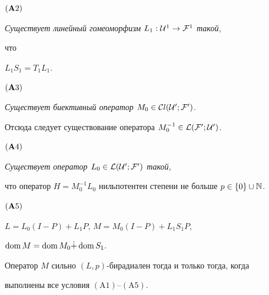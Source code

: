 $({\bold A2})$


{\it Существует линейный гомеоморфизм $L_1:{\cal U}^1\to {\cal F}^1$ такой,


что} $L_1S_1=T_1L_1$.





$({\bold A3})$


{\it Существует биективный оператор} $M_0\in {\cal C}l(\cal U^0;


\cal F^0)$.





\noindent{}Отсюда следует существование оператора $M^{-1}_0\in \cal L(


\cal F^0;\cal U^0)$.





$({\bold A4})$


{\it Существует оператор $L_0\in \cal L(\cal U^0;\cal F^0)$ такой,


что оператор $H=M^{-1}_0L_0$ нильпотентен степени не больше $p\in\{


0\}\cup {\Bbb N}$.}





$({\bold A5})$


$L=L_0(I-P)+L_1P$, $M=M_0(I-P)+L_1S_1P$,


$\operatorname{dom} M=\operatorname{dom} M_0 \Dot + \operatorname{dom} S_1.$





\begin{thms}


Оператор $M$ сильно $(L,p)$-бирадиален тогда и только тогда, когда


выполнены все условия $(\mathrm A1)$--$(\mathrm A5)$.


\end{thms}





